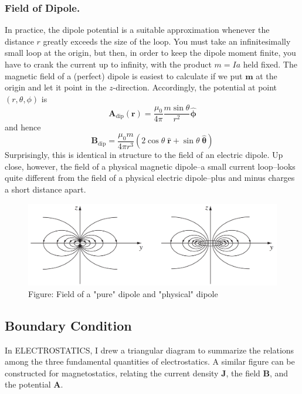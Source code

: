 \documentclass[../../../main.tex]{subfiles}
\begin{document}
\subsubsection*{Field of Dipole.} In practice, the dipole potential is a suitable approximation whenever 
the distance $r$ greatly exceeds the size of the loop. You must take an inﬁnitesimally small loop at the origin, but then, in order to keep the dipole moment ﬁnite, you have to crank the current up to inﬁnity, with the product $m = I a$ held ﬁxed. The magnetic ﬁeld of a (perfect) dipole is easiest to calculate if we put $\mathbf{m}$ at the origin and let it point in the $z$-direction. Accordingly, the potential at point $(r, \theta, \phi)$ is 
\begin{equation*}
    \mathbf{A}_\text{dip}(\mathbf{r})=\frac{\mu_0 }{4\pi  }\frac{m\sin\theta}{r^2}\boldsymbol{\hat{\phi}}
\end{equation*}
and hence
\begin{equation*}
    \mathbf{B}_\text{dip}=\frac{\mu_0 m}{4\pi  r^3}(2\cos \theta \;\mathbf{\hat{r}}+ \sin\theta\;\boldsymbol{\hat{\theta}})
\end{equation*}
Surprisingly, this is identical in structure to the ﬁeld of an electric dipole. Up close, however, the ﬁeld of a physical magnetic dipole--a small current loop--looks quite different from the ﬁeld of a physical electric 
dipole--plus and minus charges a short distance apart.
\begin{figure}[ht]
    \centering
    \includegraphics[width=\textwidth]{../Rss/Electromagnetism/Magnetostatics/DipField}
    \caption*{Figure: Field of a "pure" dipole and "physical" dipole}
\end{figure}

\subsection*{Boundary Condition}
In ELECTROSTATICS, I drew a triangular diagram to summarize the relations among the three fundamental quantities of electrostatics. A similar ﬁgure can be constructed for magnetostatics, relating the current density \textbf{J}, the ﬁeld \textbf{B}, and the potential \textbf{A}.
\end{document}
